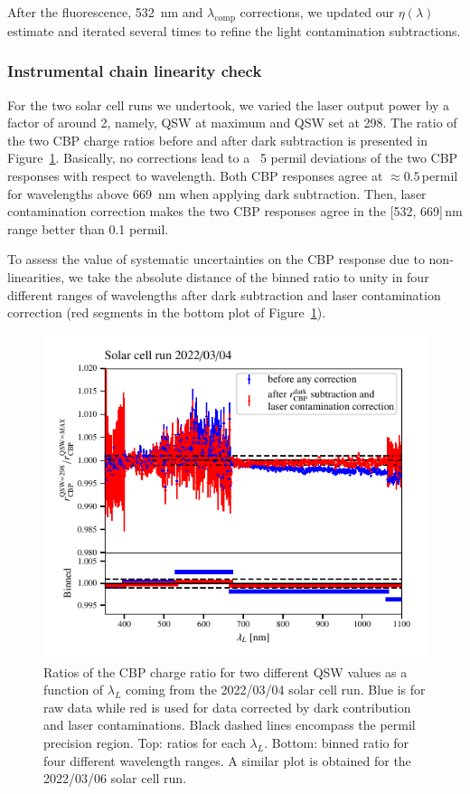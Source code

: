After the fluorescence, \SI{532}{\nano\meter} and $\lambda_{\mathrm{comp}}$ corrections, we updated our $\eta(\lambda)$ estimate and iterated several times to refine the light contamination subtractions.


\subsubsection{Instrumental chain linearity check}\label{sec:sc_linearity}
For the two solar cell runs we undertook, we varied the laser output power by a factor of around 2, namely, QSW at maximum and QSW set at 298. The ratio of the two CBP charge ratios before and after dark subtraction is presented in Figure~\ref{fig:SCqswlinearity}. Basically, no corrections lead to a ~5 permil deviations of the two CBP responses with respect to wavelength. Both CBP responses agree at $\approx 0.5\,$permil for wavelengths above \SI{669}{\nano\meter} when applying dark subtraction. Then, laser contamination correction makes the two CBP responses agree in the [532, 669]\,nm range better than 0.1 permil.

To assess the value of systematic uncertainties on the CBP response due to non-linearities, we take the absolute distance of the binned ratio to unity in four different ranges of wavelengths after dark subtraction and laser contamination correction (red segments in the bottom plot of Figure~\ref{fig:SCqswlinearity}).

\begin{figure}[h]
    \centering
    \includegraphics[width=\columnwidth]{fig/sc_qsw_ratios.pdf}
    \caption{Ratios of the CBP charge ratio for two different QSW values as a function of $\lambda_L$ coming from the 2022/03/04 solar cell run. Blue is for raw data while red is used for data corrected by dark contribution and laser contaminations. Black dashed lines encompass the permil precision region. Top: ratios for each $\lambda_L$. Bottom: binned ratio for four different wavelength ranges. A similar plot is obtained for the 2022/03/06 solar cell run.}
    \label{fig:SCqswlinearity}    
\end{figure}


